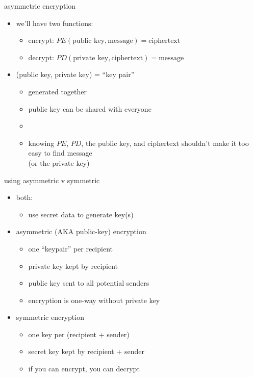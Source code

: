 \begin{frame}{asymmetric encryption}
\begin{itemize}
\item we'll have two functions:
    \begin{itemize}
    \item encrypt: $PE(\text{public key}, \text{message}) = \text{ciphertext}$
    \item decrypt: $PD(\text{private key}, \text{ciphertext}) = \text{message}$
    \end{itemize}
\item (public key, private key) = ``key pair''
    \begin{itemize}
    \item generated together
    \item public key can be shared with everyone
    \item {}
    \item knowing $PE$, $PD$, the public key, and ciphertext shouldn't make it too easy to find message \\
        (or the private key)
    \end{itemize}
\end{itemize}
\end{frame}

\begin{frame}{using asymmetric v symmetric}
\begin{itemize}
    \item both:
        \begin{itemize}
            \item use secret data to generate key(s)
        \end{itemize}
    \item asymmetric (AKA public-key) encryption
        \begin{itemize}
            \item one ``keypair'' per recipient
            \item private key kept by recipient
            \item public key sent to all potential senders
            \item encryption is one-way without private key
        \end{itemize}
    \item symmetric encryption
        \begin{itemize}
            \item one key per (recipient + sender)
            \item secret key kept by recipient + sender
            \item if you can encrypt, you can decrypt
        \end{itemize}
\end{itemize}
\end{frame}


